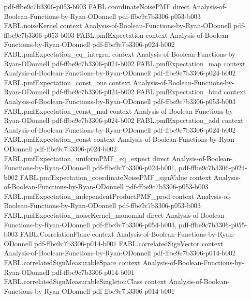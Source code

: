\begin{theorem}
  {pdf-ffbe9c7b3306-p053-b003}
\proofstep
  {FABL.coordinateNoisePMF}
  {direct}
  {Analysis-of-Boolean-Functions-by-Ryan-ODonnell}
  {pdf-ffbe9c7b3306-p053-b003}
\proofstep
  {FABL.noiseKernel}
  {context}
  {Analysis-of-Boolean-Functions-by-Ryan-ODonnell}
  {pdf-ffbe9c7b3306-p053-b003}
\proofstep
  {FABL.pmfExpectation}
  {context}
  {Analysis-of-Boolean-Functions-by-Ryan-ODonnell}
  {pdf-ffbe9c7b3306-p024-b002}
\proofstep
  {FABL.pmfExpectation_eq_integral}
  {context}
  {Analysis-of-Boolean-Functions-by-Ryan-ODonnell}
  {pdf-ffbe9c7b3306-p024-b002}
\proofstep
  {FABL.pmfExpectation_map}
  {context}
  {Analysis-of-Boolean-Functions-by-Ryan-ODonnell}
  {pdf-ffbe9c7b3306-p024-b002}
\proofstep
  {FABL.pmfExpectation_const_one}
  {context}
  {Analysis-of-Boolean-Functions-by-Ryan-ODonnell}
  {pdf-ffbe9c7b3306-p024-b002}
\proofstep
  {FABL.pmfExpectation_bind}
  {context}
  {Analysis-of-Boolean-Functions-by-Ryan-ODonnell}
  {pdf-ffbe9c7b3306-p053-b003}
\proofstep
  {FABL.pmfExpectation_const_mul}
  {context}
  {Analysis-of-Boolean-Functions-by-Ryan-ODonnell}
  {pdf-ffbe9c7b3306-p024-b002}
\proofstep
  {FABL.pmfExpectation_add}
  {context}
  {Analysis-of-Boolean-Functions-by-Ryan-ODonnell}
  {pdf-ffbe9c7b3306-p024-b002}
\proofstep
  {FABL.pmfExpectation_const}
  {context}
  {Analysis-of-Boolean-Functions-by-Ryan-ODonnell}
  {pdf-ffbe9c7b3306-p024-b002}
\proofstep
  {FABL.pmfExpectation_uniformPMF_eq_expect}
  {direct}
  {Analysis-of-Boolean-Functions-by-Ryan-ODonnell}
  {pdf-ffbe9c7b3306-p024-b001,
    pdf-ffbe9c7b3306-p024-b002}
\proofstep
  {FABL.pmfExpectation_coordinateNoisePMF_signValue}
  {context}
  {Analysis-of-Boolean-Functions-by-Ryan-ODonnell}
  {pdf-ffbe9c7b3306-p053-b003}
\proofstep
  {FABL.pmfExpectation_independentProductPMF_prod}
  {context}
  {Analysis-of-Boolean-Functions-by-Ryan-ODonnell}
  {pdf-ffbe9c7b3306-p053-b003}
\proofstep
  {FABL.pmfExpectation_noiseKernel_monomial}
  {direct}
  {Analysis-of-Boolean-Functions-by-Ryan-ODonnell}
  {pdf-ffbe9c7b3306-p054-b003,
    pdf-ffbe9c7b3306-p055-b003}
\proofstep
  {FABL.CorrelationPlane}
  {context}
  {Analysis-of-Boolean-Functions-by-Ryan-ODonnell}
  {pdf-ffbe9c7b3306-p014-b001}
\proofstep
  {FABL.correlatedSignVector}
  {context}
  {Analysis-of-Boolean-Functions-by-Ryan-ODonnell}
  {pdf-ffbe9c7b3306-p014-b002}
\proofstep
  {FABL.correlatedSignMeasurableSpace}
  {context}
  {Analysis-of-Boolean-Functions-by-Ryan-ODonnell}
  {pdf-ffbe9c7b3306-p014-b001}
\proofstep
  {FABL.correlatedSignMeasurableSingletonClass}
  {context}
  {Analysis-of-Boolean-Functions-by-Ryan-ODonnell}
  {pdf-ffbe9c7b3306-p014-b001}

\end{theorem}
